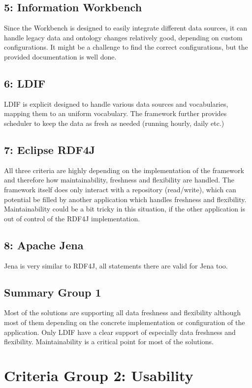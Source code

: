 \subsection*{5: Information Workbench}
Since the Workbench is designed to easily integrate different data sources, it can handle legacy data and ontology changes relatively good, depending on custom configurations. It might be a challenge to find the correct configurations, but the provided documentation is well done.

\subsection*{6: LDIF}
LDIF is explicit designed to handle various data sources and vocabularies, mapping them to an uniform vocabulary. The framework further provides scheduler to keep the data as fresh as needed (running hourly, daily etc.)

\subsection*{7: Eclipse RDF4J}
All three criteria are highly depending on the implementation of the framework and therefore how maintainability, freshness and flexibility are handled. The framework itself does only interact with a repository (read/write), which can potential be filled by another application which handles freshness and flexibility. Maintainability could be a bit tricky in this situation, if the other application is out of control of the RDF4J implementation.

\subsection*{8: Apache Jena}
Jena is very similar to RDF4J, all statements there are valid for Jena too.

\subsection{Summary Group 1}
Most of the solutions are supporting all data freshness and flexibility although most of them depending on the concrete implementation or configuration of the application. Only LDIF have a clear support of especially data freshness and flexibility. Maintainability is a critical point for most of the solutions.

\section{Criteria Group 2: Usability}

